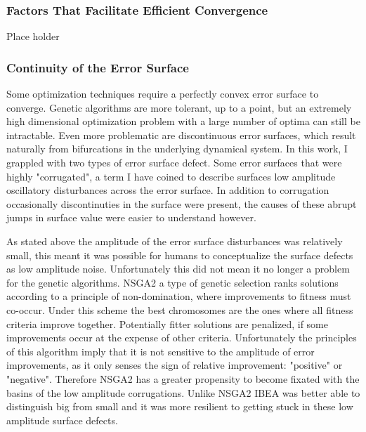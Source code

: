 

\subsubsection{Factors That Facilitate Efficient Convergence}
Place holder


\subsubsection{Continuity of the Error Surface}
Some optimization techniques require a perfectly convex error surface to converge.
Genetic algorithms are more tolerant, up to a point, but an extremely high dimensional optimization problem with a large number of optima can still be intractable.
Even more problematic are discontinuous error surfaces, which result naturally from bifurcations in the underlying dynamical system.
In this work, I grappled with two types of error surface defect. Some error surfaces that were highly "corrugated", a term I have coined to describe surfaces low amplitude oscillatory disturbances across the error surface. In addition to corrugation occasionally discontinuties in the surface were present, the causes of these abrupt jumps in surface value were easier to understand however.  

As stated above the amplitude of the error surface disturbances was relatively small, this meant it was possible for humans to conceptualize the surface defects as low amplitude noise.
Unfortunately this did not mean it no longer a problem for the genetic algorithms. NSGA2 a type of genetic selection ranks solutions according to a principle of non-domination, where improvements to fitness must co-occur. Under this scheme the best chromosomes are the ones where all fitness criteria improve together. Potentially fitter solutions are penalized, if some improvements occur at the expense of other criteria. Unfortunately the principles of this algorithm imply that it is not sensitive to the amplitude of error improvements, as it only senses the sign of relative improvement: "positive" or "negative". Therefore NSGA2 has a greater propensity to become fixated with the basins of the low amplitude corrugations. Unlike NSGA2 IBEA was better able to distinguish big from small and it was more resilient to getting stuck in these low amplitude surface defects. 


